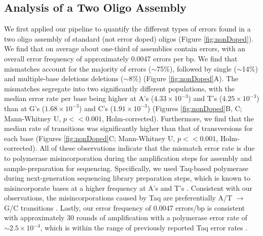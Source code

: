 \documentclass[letterpaper,12pt]{article}
\begin{document}

\subsection*{Analysis of a Two Oligo Assembly}

We first applied our pipeline to quantify the different types of errors found in a two oligo assembly of standard (not error doped) oligos (Figure \ref{fig:nonDoped}). We find that on average about one-third of assemblies contain errors, with an overall error frequency of approximately 0.0047 errors per bp. We find that mismatches account for the majority of errors ($\sim$75\%), followed by single ($\sim$14\%) and multiple-base deletions deletions ($\sim$8\%) (Figure \ref{fig:nonDoped}A). The mismatches segregate into two significantly different populations, with the median error rate per base being higher at A's ($4.33\times10^{-3}$) and T's ($4.25\times10^{-3}$) than at G's ($1.68\times10^{-3}$) and C's ($1.91\times10^{-3}$) (Figures \ref{fig:nonDoped}B, C; Mann-Whitney U, $p << 0.001$, Holm-corrected). Furthermore, we find that the median rate of transitions was significantly higher than that of transversions for each base (Figures \ref{fig:nonDoped}C; Mann-Whitney U, $p << 0.001$, Holm-corrected). All of these observations indicate that the mismatch error rate is due to polymerase misincorporation during the amplification steps for assembly and sample-preparation for sequencing. Specifically, we used Taq-based polymerase during next-generation sequencing library preparation steps, which is known to misincorporate bases at a higher frequency at A's and T's \cite{keohavong1989}. Consistent with our observations, the misincorporations caused by Taq are preferentially A/T $\to$ G/C transitions \cite{hestand2016,mcinerney2014}. Lastly, our error frequency of 0.0047 errors/bp is consistent with approximately 30 rounds of amplification with a polymerase error rate of $\sim2.5\times10^{-4}$, which is within the range of previously reported Taq error rates \cite{saiki1988,lee2016}.
\end{document}
